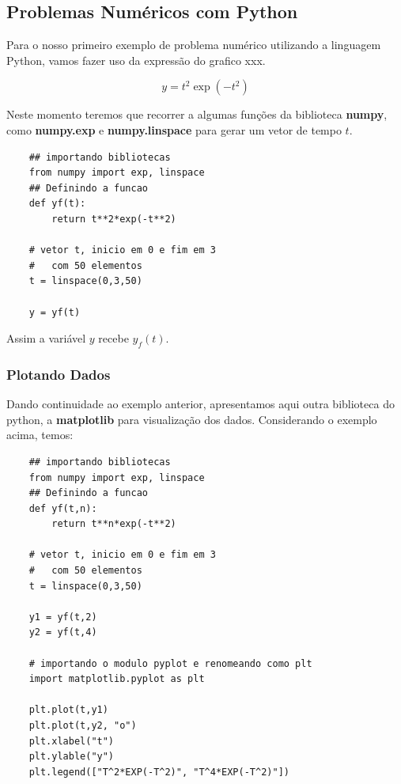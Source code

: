 \subsection{Problemas Numéricos com Python}

Para o nosso primeiro exemplo de problema numérico utilizando a linguagem Python, vamos fazer uso da expressão do grafico xxx.

\begin{equation*}
    y = t^2\exp(-t^2)
\end{equation*}

Neste momento teremos que recorrer a algumas funções da biblioteca \textbf{numpy}, como \textbf{numpy.exp} e \textbf{numpy.linspace} para gerar um vetor de tempo $t$.

\begin{lstlisting}
    ## importando bibliotecas
    from numpy import exp, linspace
    ## Definindo a funcao
    def yf(t):
        return t**2*exp(-t**2)

    # vetor t, inicio em 0 e fim em 3
    #   com 50 elementos
    t = linspace(0,3,50)

    y = yf(t)
\end{lstlisting}

Assim a variável $y$ recebe $y_f(t)$.

\subsubsection{Plotando Dados}

Dando continuidade ao exemplo anterior, apresentamos aqui outra biblioteca do python, a  \textbf{matplotlib} para visualização dos dados.
Considerando o exemplo acima, temos:

\begin{lstlisting}
    ## importando bibliotecas
    from numpy import exp, linspace
    ## Definindo a funcao
    def yf(t,n):
        return t**n*exp(-t**2)

    # vetor t, inicio em 0 e fim em 3
    #   com 50 elementos
    t = linspace(0,3,50)

    y1 = yf(t,2)
    y2 = yf(t,4)

    # importando o modulo pyplot e renomeando como plt
    import matplotlib.pyplot as plt

    plt.plot(t,y1)
    plt.plot(t,y2, "o")
    plt.xlabel("t")
    plt.ylable("y")
    plt.legend(["T^2*EXP(-T^2)", "T^4*EXP(-T^2)"])
\end{lstlisting}

